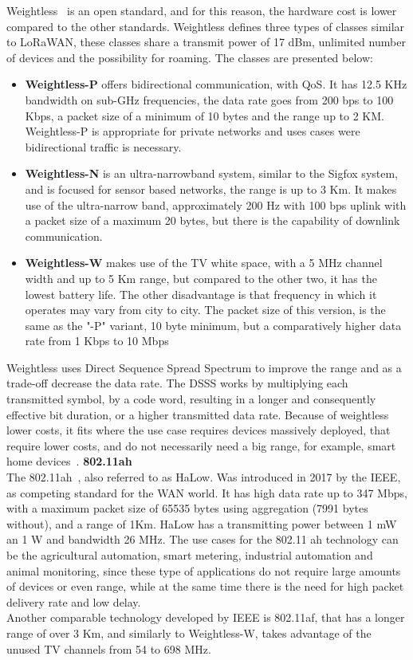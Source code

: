 Weightless~\cite{Weightlesswebb2012understanding} is an open standard, and for this reason, the hardware cost is lower compared to the other standards. Weightless defines three types of classes similar to LoRaWAN, these classes share a transmit power of 17 dBm, unlimited number of devices and the possibility for roaming. The classes are presented below:
\begin{itemize}
	\item \textbf{Weightless-P} offers bidirectional communication, with QoS. It has 12.5 KHz bandwidth on sub-GHz frequencies, the data rate goes from 200 bps to 100 Kbps, a packet size of a minimum of 10 bytes and the range up to 2 KM. Weightless-P is appropriate for private networks and uses cases were bidirectional traffic is necessary.
	\item\textbf{Weightless-N} is an ultra-narrowband system, similar to the Sigfox system, and is  focused for sensor based networks, the range is up to 3 Km. It makes use of the ultra-narrow band, approximately  200 Hz with 100 bps uplink with a packet size of a maximum 20 bytes, but there is the capability of downlink communication.
	\item \textbf{Weightless-W} makes use of the TV white space, with a 5 MHz channel width and up to 5 Km range, but compared to the other two, it has the lowest battery life. The other disadvantage is that frequency in which it operates may vary from city to city. The packet size of this version, is the same as the "-P" variant, 10 byte minimum, but a comparatively higher data rate from 1 Kbps to 10 Mbps

\end{itemize} 
Weightless uses Direct Sequence Spread Spectrum to improve the range and as a trade-off decrease the data rate. 
The DSSS  works by multiplying each transmitted symbol, by a code word, resulting in a longer and consequently effective bit duration, or a higher transmitted data rate. Because of weightless lower costs, it fits where the use case requires devices massively deployed, that require lower costs, and do not  necessarily need a big range, for example, smart home devices~\cite{LPRaza2017}.\newline\newline
\textbf{802.11ah}\\

The 802.11ah~\cite{Adame2014}, also referred to as HaLow. Was introduced in 2017 by the IEEE, as competing standard for the WAN world. It has high data rate up to 347 Mbps, with a maximum packet size of 65535 bytes using aggregation (7991 bytes without), and a range of 1Km. HaLow has a  transmitting power between 1 mW an 1 W and bandwidth 26 MHz. 
The use cases for the 802.11 ah technology can be the agricultural automation, smart metering, industrial automation and animal monitoring, since these type of applications do not require large amounts of devices or even range, while at the same time there is the need for high packet delivery rate and low delay.\\
Another comparable technology developed by IEEE is 802.11af, that has a longer range of over 3 Km, and similarly to Weightless-W, takes advantage of the  unused TV channels from 54 to 698 MHz.

